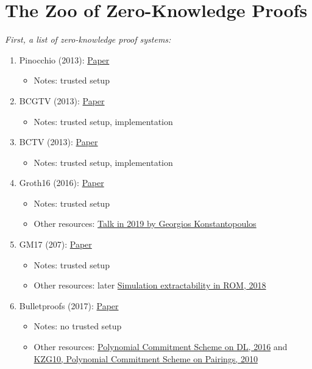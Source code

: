 \chapter{The Zoo of Zero-Knowledge Proofs}

{\it First, a list of zero-knowledge proof systems:

\begin{enumerate}
	\item Pinocchio (2013): \href{https://eprint.iacr.org/2013/279.pdf}{{Paper}}
	\begin{itemize}[label={--}]
		\item Notes: trusted setup
	\end{itemize}

	\item BCGTV (2013): \href{https://eprint.iacr.org/2013/507.pdf}{{Paper}}
	\begin{itemize}[label={--}]
		\item Notes: trusted setup, implementation
	\end{itemize}

	\item BCTV (2013): \href{https://eprint.iacr.org/2013/879.pdf}{{Paper}}
	\begin{itemize}[label={--}]
		\item Notes: trusted setup, implementation
	\end{itemize}

	\item Groth16 (2016): 	\href{https://eprint.iacr.org/2016/260.pdf}{Paper}
	\begin{itemize}[label={--}]
		\item Notes: trusted setup
		\item Other resources: \href{https://www.gakonst.com/zksummit2019.pdf}{Talk in 2019 by Georgios Konstantopoulos}
	\end{itemize}

	\item GM17 (207): 	\href{https://eprint.iacr.org/2017/540.pdf}{Paper}
	\begin{itemize}[label={--}]
		\item Notes: trusted setup
		\item Other resources: later \href{https://eprint.iacr.org/2018/187}{Simulation extractability in ROM, 2018}
	\end{itemize}

	\item Bulletproofs (2017): \href{https://eprint.iacr.org/2017/1066.pdf}{Paper}
	\begin{itemize}[label={--}]
		\item Notes: no trusted setup
		\item Other resources: \href{https://eprint.iacr.org/2016/263.pdf}{Polynomial Commitment Scheme on DL, 2016} and \href{https://www.iacr.org/archive/asiacrypt2010/6477178/6477178.pdf}{KZG10, Polynomial Commitment Scheme on Pairings, 2010}
	\end{itemize}


\end{enumerate}}
